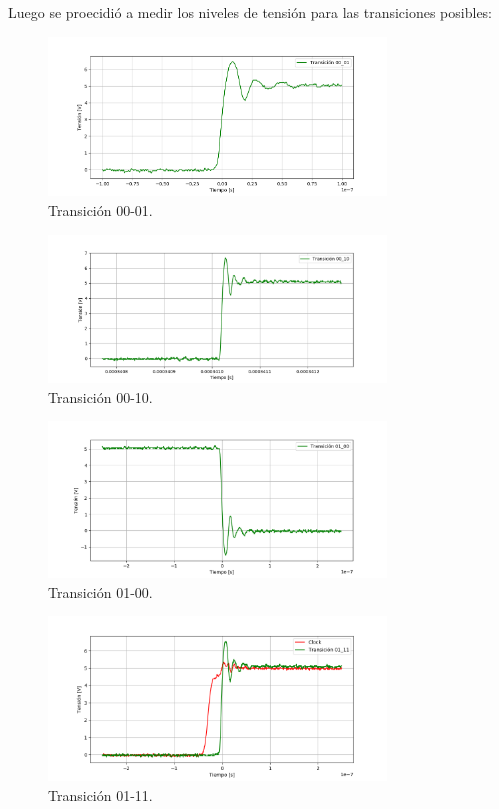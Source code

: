 Luego se proecidió a medir los niveles de tensión para las transiciones posibles:
 \begin{figure}[H]
	\centering
	\includegraphics[width=0.8\textwidth]{ImagenesEjercicio1/00-01.PNG}
	\caption{Transición 00-01.}
	\label{fig:0001}
\end{figure}
 \begin{figure}[H]
	\centering
	\includegraphics[width=0.8\textwidth]{ImagenesEjercicio1/00-10.PNG}
	\caption{Transición 00-10.}
	\label{fig:0010}
\end{figure}
 \begin{figure}[H]
	\centering
	\includegraphics[width=0.8\textwidth]{ImagenesEjercicio1/01-00.PNG}
	\caption{Transición 01-00.}
	\label{fig:0100}
\end{figure}
 \begin{figure}[H]
	\centering
	\includegraphics[width=0.8\textwidth]{ImagenesEjercicio1/01-11.PNG}
	\caption{Transición 01-11.}
	\label{fig:0111}
\end{figure}
